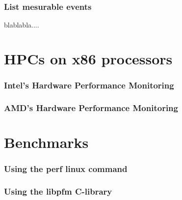 \documentclass{rapport}
\begin{document}
	\section{List mesurable events}

	blablabla....

	\part{HPCs on x86 processors}

	\section{Intel's Hardware Performance Monitoring}

	\section{AMD's Hardware Performance Monitoring}

	\part{Benchmarks}

	\section{Using the perf linux command}

	\section{Using the libpfm C-library}

	\pageblanche
	
	
\end{document}
